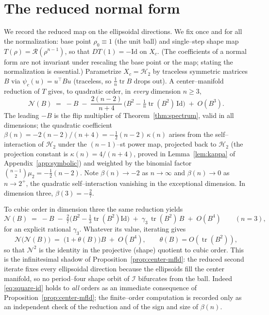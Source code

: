 \documentclass[11pt,reqno]{amsart}
\theoremstyle{plain}
\theoremstyle{definition}
\newcommand{\Rad}{\mathcal{R}}
\newcommand{\IB}{\mathcal{I}}
\newcommand{\Hd}[1]{\mathcal{H}_{#1}}
\DeclareMathOperator{\tr}{tr}
\begin{document}
\section{The reduced normal form}\label{sec:normalform}

We record the reduced map on the ellipsoidal directions. We fix once and for
all the normalization: base point $\rho_0\equiv1$ (the unit ball) and
single--step shape map $T(\rho)=\Rad(\rho^{n-1})$, so that $DT(1)=-\mathrm{Id}$
on $X_c$. (The coefficients of a normal form are not invariant under rescaling
the base point or the map; stating the normalization is essential.) Parametrize
$X_c=\Hd2$ by traceless symmetric matrices $B$ via $\psi_c(u)=u^\top B u$
(traceless, so $\tfrac1n\tr B$ drops out). A center--manifold reduction of $T$
gives, to quadratic order, in \emph{every} dimension $n\ge3$,
\begin{equation}\label{eq:normalform}
   \mathcal N(B)\;=\;-B\;-\;\frac{2(n-2)}{n+4}\,
   \Big(B^2-\tfrac1n\tr(B^2)\,\mathrm{Id}\Big)\;+\;O(B^3).
\end{equation}
The leading $-B$ is the flip multiplier of Theorem~\ref{thm:spectrum}, valid in
all dimensions; the quadratic coefficient
$\beta(n)=-2(n-2)/(n+4)=-\tfrac12(n-2)\,\kappa(n)$ arises from the
self--interaction of $\Hd2$ under the $(n-1)$--st power map, projected back to
$\Hd2$ (the projection constant is $\kappa(n)=4/(n+4)$, proved in
Lemma~\ref{lem:kappa} of Appendix~\ref{app:symbolic}) and weighted by the
binomial factor $\binom{n-1}{2}\mu_2=-\tfrac12(n-2)$. Note $\beta(n)\to-2$ as
$n\to\infty$ and $\beta(n)\to0$ as $n\to2^+$, the quadratic self--interaction
vanishing in the exceptional dimension. In dimension three,
$\beta(3)=-\tfrac{2}{7}$.

To cubic order in dimension three the same reduction yields
\begin{equation}\label{eq:normalform3}
   \mathcal N(B)\;=\;-B\;-\;\tfrac{2}{7}\big(B^2-\tfrac13\tr(B^2)\mathrm{Id}\big)
   \;+\;\gamma_3\,\tr(B^2)\,B\;+\;O(B^4)\qquad(n=3),
\end{equation}
for an explicit rational $\gamma_3$. Whatever its value, iterating gives
\begin{equation}\label{eq:square-id}
   \mathcal N\big(\mathcal N(B)\big)\;=\;\big(1+\theta(B)\big)B\;+\;O(B^4),
   \qquad \theta(B)=O(\tr(B^2)),
\end{equation}
so that $\mathcal N^{2}$ is the identity in the projective (shape) quotient to
cubic order. This is the infinitesimal shadow of
Proposition~\ref{prop:center-mfld}: the reduced second iterate fixes every
ellipsoidal direction because the ellipsoids fill the center manifold, so no
period--four shape orbit of $\IB$ bifurcates from the ball. Indeed
\eqref{eq:square-id} holds to \emph{all} orders as an immediate consequence of
Proposition~\ref{prop:center-mfld}; the finite--order computation is recorded
only as an independent check of the reduction and of the sign and size of
$\beta(n)$.
\end{document}
